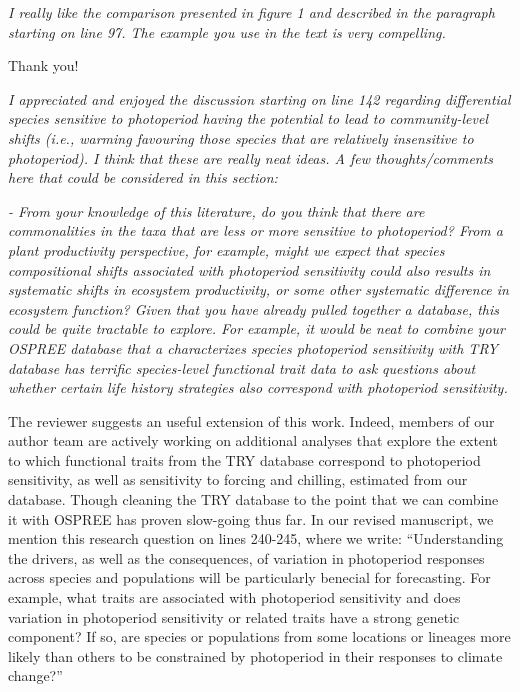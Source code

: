 \documentclass{article}
\begin{document}
\par \emph{I really like the comparison presented in figure 1 and described in the paragraph starting on line 97. The example you use in the text is very compelling. }
\par Thank you!
\par \emph{I appreciated and enjoyed the discussion starting on line 142 regarding differential species sensitive to photoperiod having the potential to lead to community-level shifts (i.e., warming favouring those species that are relatively insensitive to photoperiod). I think that these are really neat ideas. A few thoughts/comments here that could be considered in this section: }
\par \emph{- From your knowledge of this literature, do you think that there are commonalities in the taxa that are less or more sensitive to photoperiod? From a plant productivity perspective, for example, might we expect that species compositional shifts associated with photoperiod sensitivity could also results in systematic shifts in ecosystem productivity, or some other systematic difference in ecosystem function? Given that you have already pulled together a database, this could be quite tractable to explore. For example, it would be neat to combine your OSPREE database that a characterizes species photoperiod sensitivity with TRY database has terrific species-level functional trait data to ask questions about whether certain life history strategies also correspond with photoperiod sensitivity. }
\par The reviewer suggests an useful extension of this work. Indeed, members of our author team are actively working on additional analyses that explore the extent to which functional traits from the TRY database correspond to photoperiod sensitivity, as well as sensitivity to forcing and chilling, estimated from our database. Though cleaning the TRY database to the point that we can combine it with OSPREE has proven slow-going thus far. In our revised manuscript, we mention this research question on lines 240-245, where we write:
``Understanding the drivers, as well as the consequences, of variation in photoperiod responses across species and populations will be particularly benecial for forecasting. For example, what traits are associated with photoperiod sensitivity and does variation in photoperiod sensitivity or related traits have a strong genetic component? If so, are species or populations from some locations or lineages more likely than others to be constrained by photoperiod in their responses to climate change?''
\end{document}
